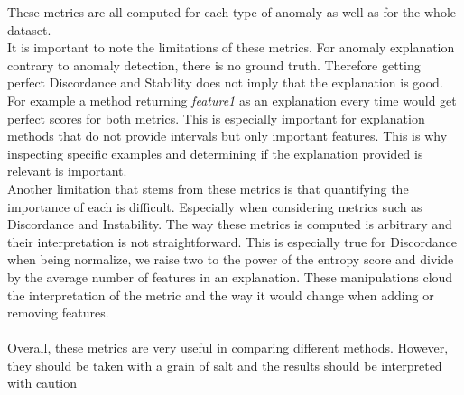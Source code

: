 \documentclass[oneside, a4paper, onecolumn, 11pt]{article}
\begin{document}
These metrics are all computed for each type of anomaly as well as for the whole dataset.\\
It is important to note the limitations of these metrics. For anomaly explanation contrary to anomaly detection, there is no ground truth. Therefore getting perfect Discordance and Stability does not imply that the explanation is good. For example a method returning \textit{feature1} as an explanation every time would get perfect scores for both metrics. This is especially important for explanation methods that do not provide intervals but only important features. This is why inspecting specific examples and determining if the explanation provided is relevant is important.\\
Another limitation that stems from these metrics is that quantifying the importance of each is difficult. Especially when considering metrics such as Discordance and Instability. The way these metrics is computed is arbitrary and their interpretation is not straightforward. This is especially true for Discordance when being normalize, we raise two to the power of the entropy score and divide by the average number of features in an explanation. These manipulations cloud the interpretation of the metric and the way it would change when adding or removing features.\\\\
Overall, these metrics are very useful in comparing different methods. However, they should be taken with a grain of salt and the results should be interpreted with caution\\  
\end{document}
